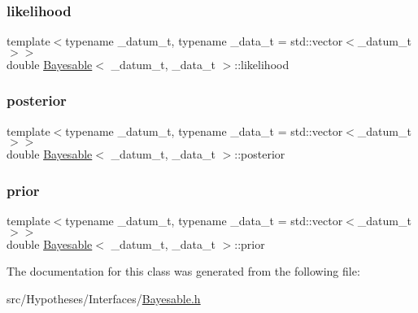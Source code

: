 \subsubsection{\texorpdfstring{likelihood}{likelihood}}
{\footnotesize\ttfamily template$<$typename \+\_\+datum\+\_\+t, typename \+\_\+data\+\_\+t = std\+::vector$<$\+\_\+datum\+\_\+t$>$$>$ \\
double \hyperlink{class_bayesable}{Bayesable}$<$ \+\_\+datum\+\_\+t, \+\_\+data\+\_\+t $>$\+::likelihood}

\mbox{\label{class_bayesable_a268442b9aae5b763c17ca29c39231915}} 
\subsubsection{\texorpdfstring{posterior}{posterior}}
{\footnotesize\ttfamily template$<$typename \+\_\+datum\+\_\+t, typename \+\_\+data\+\_\+t = std\+::vector$<$\+\_\+datum\+\_\+t$>$$>$ \\
double \hyperlink{class_bayesable}{Bayesable}$<$ \+\_\+datum\+\_\+t, \+\_\+data\+\_\+t $>$\+::posterior}

\mbox{\label{class_bayesable_a473790922c2dd73e227350d029d73003}} 
\subsubsection{\texorpdfstring{prior}{prior}}
{\footnotesize\ttfamily template$<$typename \+\_\+datum\+\_\+t, typename \+\_\+data\+\_\+t = std\+::vector$<$\+\_\+datum\+\_\+t$>$$>$ \\
double \hyperlink{class_bayesable}{Bayesable}$<$ \+\_\+datum\+\_\+t, \+\_\+data\+\_\+t $>$\+::prior}



The documentation for this class was generated from the following file\+:\begin{DoxyCompactItemize}
\item 
src/\+Hypotheses/\+Interfaces/\hyperlink{_bayesable_8h}{Bayesable.\+h}\end{DoxyCompactItemize}

